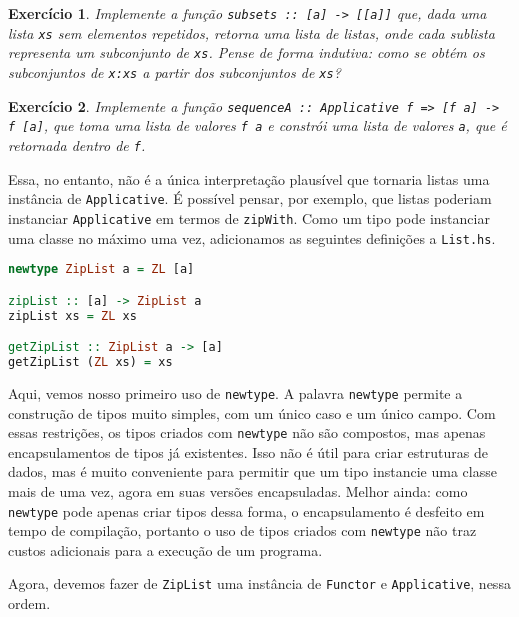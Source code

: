 \documentclass[a4paper]{article}
\newtheorem{exercicio}{Exercício}
\begin{document}
\begin{exercicio} \label{exercicio:subsets}
	Implemente a função \emph{\texttt{subsets :: [a] -> [[a]]}} que, dada uma lista \emph{\texttt{xs}} sem elementos repetidos, retorna uma lista de listas, onde cada sublista representa um subconjunto de \emph{\texttt{xs}}.
	Pense de forma indutiva: como se obtém os subconjuntos de \emph{\texttt{x:xs}} a partir dos subconjuntos de \emph{\texttt{xs}}?
\end{exercicio}

\begin{exercicio}	\label{exercicio:sequenceA}
	Implemente a função \emph{\texttt{sequenceA :: Applicative f => [f a] -> f [a]}}, que toma uma lista de valores \emph{\texttt{f a}} e constrói uma lista de valores \emph{\texttt{a}}, que é retornada dentro de \emph{\texttt{f}}.
\end{exercicio}

Essa, no entanto, não é a única interpretação plausível que tornaria listas uma instância de \texttt{Applicative}.
É possível pensar, por exemplo, que listas poderiam instanciar \texttt{Applicative} em termos de \texttt{zipWith}.
Como um tipo pode instanciar uma classe no máximo uma vez, adicionamos as seguintes definições a \texttt{List.hs}.

\begin{lstlisting}[language=haskell, frame=single]
newtype ZipList a = ZL [a]

zipList :: [a] -> ZipList a
zipList xs = ZL xs

getZipList :: ZipList a -> [a]
getZipList (ZL xs) = xs
\end{lstlisting}

Aqui, vemos nosso primeiro uso de \texttt{newtype}.
A palavra \texttt{newtype} permite a construção de tipos muito simples, com um único caso e um único campo.
Com essas restrições, os tipos criados com \texttt{newtype} não são compostos, mas apenas encapsulamentos de tipos já existentes.
Isso não é útil para criar estruturas de dados, mas é muito conveniente para permitir que um tipo instancie uma classe mais de uma vez, agora em suas versões encapsuladas.
Melhor ainda: como \texttt{newtype} pode apenas criar tipos dessa forma, o encapsulamento é desfeito em tempo de compilação, portanto o uso de tipos criados com \texttt{newtype} não traz custos adicionais para a execução de um programa.

Agora, devemos fazer de \texttt{ZipList} uma instância de \texttt{Functor} e \texttt{Applicative}, nessa ordem.
\end{document}
